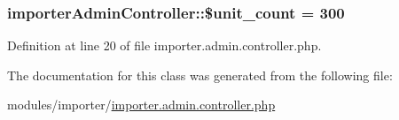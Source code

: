 \subsubsection[{\texorpdfstring{\$unit\+\_\+count}{$unit_count}}]{\setlength{\rightskip}{0pt plus 5cm}importer\+Admin\+Controller\+::\$unit\+\_\+count = 300}\hypertarget{classimporterAdminController_ac425370d30482b23546a0a16da75792c}{}\label{classimporterAdminController_ac425370d30482b23546a0a16da75792c}


Definition at line 20 of file importer.\+admin.\+controller.\+php.



The documentation for this class was generated from the following file\+:\begin{DoxyCompactItemize}
\item 
modules/importer/\hyperlink{importer_8admin_8controller_8php}{importer.\+admin.\+controller.\+php}\end{DoxyCompactItemize}
